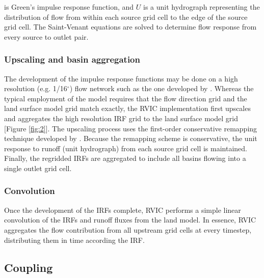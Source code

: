 \documentclass[jgrga, draft]{agutex}
\begin{document}
\begin{article}
is Green’s impulse response function, and $U$ is a unit hydrograph representing the distribution of flow from within each source grid cell to the edge of the source grid cell.
The Saint-Venant equations are solved to determine flow response from every source to outlet pair.

\subsubsection{Upscaling and basin aggregation}
\label{sec:remap}

The development of the impulse response functions may be done on a high resolution (e.g. 1/16$^{\circ}$) flow network such as the one developed by \citet{Wu_2011}.
Whereas the typical employment of the \citet{Lohmann_1996} model requires that the flow direction grid and the land surface model grid match exactly, the RVIC implementation first upscales and aggregates the high resolution IRF grid to the land surface model grid [Figure \ref{fig:2}].
The upscaling process uses the first-order conservative remapping technique developed by \citep{Jones_1999}.
Because the remapping scheme is conservative, the unit response to runoff (unit hydrograph) from each source grid cell is maintained.
Finally, the regridded IRFs are aggregated to include all basins flowing into a single outlet grid cell.

\subsubsection{Convolution}
\label{sec:convolution}

Once the development of the IRFs complete, RVIC performs a simple linear convolution of the IRFs and runoff fluxes from the land model.
In essence, RVIC aggregates the flow contribution from all upstream grid cells at every timestep, distributing them in time according the IRF.

\subsection{Coupling}
\label{sec:coupling}


\end{article}
\end{document}
